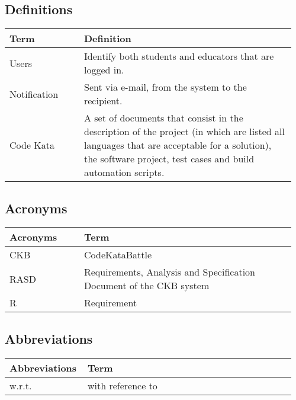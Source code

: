     \subsection{Definitions}
    \begin{center}
	\begin{tabular}{@{}p{0.25\linewidth} p{0.71\linewidth}@{}}
		\toprule
		\textbf{Term} & \textbf{Definition}\\
		\midrule
		Users & Identify both students and educators that are logged in. \\
            Notification & Sent via e-mail, from the system to the recipient. \\
            Code Kata & A set of documents that consist in the description of the project (in which are listed all languages that are acceptable for a solution), the software project, test cases and build automation scripts. \\
		\bottomrule
	\end{tabular}
    \end{center}
    
    \subsection{Acronyms}
    \begin{center}
	\begin{tabular}{@{}p{0.25\linewidth} p{0.71\linewidth}@{}}
		\toprule
		\textbf{Acronyms} & \textbf{Term}\\
		\midrule
		CKB & CodeKataBattle\\
            RASD & Requirements, Analysis and Specification Document of the CKB system\\
            R & Requirement\\
		\bottomrule
	\end{tabular}
    \end{center}

    \subsection{Abbreviations}
    \begin{center}
	\begin{tabular}{@{}p{0.25\linewidth} p{0.71\linewidth}@{}}
		\toprule
		\textbf{Abbreviations} & \textbf{Term}\\
		\midrule
		w.r.t. & with reference to\\
		\bottomrule
	\end{tabular}
    \end{center}
    
